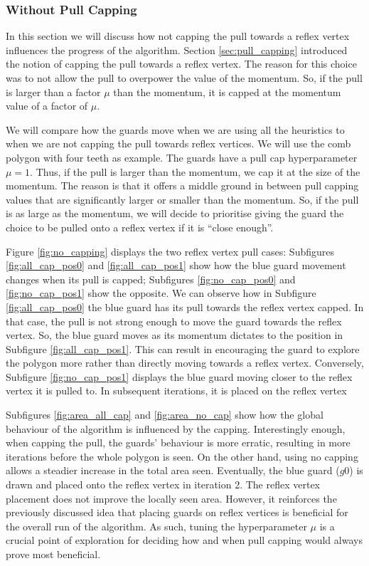 \subsubsection{Without Pull Capping}
In this section we will discuss how not capping the pull towards a reflex vertex influences the progress of the algorithm. Section \ref{sec:pull_capping} introduced the notion of capping the pull towards a reflex vertex. The reason for this choice was to not allow the pull to overpower the value of the momentum. So, if the pull is larger than a factor $\mu$ than the momentum, it is capped at the momentum value of a factor of $\mu$. 

We will compare how the guards move when we are using all the heuristics to when we are not capping the pull towards reflex vertices. We will use the comb polygon with four teeth as example. The guards have a pull cap hyperparameter $\mu = 1$. Thus, if the pull is larger than the momentum, we cap it at the size of the momentum. The reason is that it offers a middle ground in between pull capping values that are significantly larger or smaller than the momentum. So, if the pull is as large as the momentum, we will decide to prioritise giving the guard the choice to be pulled onto a reflex vertex if it is ``close enough''.

Figure \ref{fig:no_capping} displays the two reflex vertex pull cases: Subfigures \ref{fig:all_cap_pos0} and \ref{fig:all_cap_pos1} show how the blue guard movement changes when its pull is capped; Subfigures \ref{fig:no_cap_pos0} and \ref{fig:no_cap_pos1} show the opposite. We can observe how in Subfigure \ref{fig:all_cap_pos0} the blue guard has its pull towards the reflex vertex capped. In that case, the pull is not strong enough to move the guard towards the reflex vertex. So, the blue guard moves as its momentum dictates to the position in Subfigure \ref{fig:all_cap_pos1}. This can result in encouraging the guard to explore the polygon more rather than directly moving towards a reflex vertex.
Conversely, Subfigure \ref{fig:no_cap_pos1} displays the blue guard moving closer to the reflex vertex it is pulled to. In subsequent iterations, it is placed on the reflex vertex

Subfigures \ref{fig:area_all_cap} and \ref{fig:area_no_cap} show how the global behaviour of the algorithm is influenced by the capping. Interestingly enough, when capping the pull, the guards' behaviour is more erratic, resulting in more iterations before the whole polygon is seen. On the other hand, using no capping allows a steadier increase in the total area seen. Eventually, the blue guard ($g0$) is drawn and placed onto the reflex vertex in iteration 2. The reflex vertex placement does not improve the locally seen area. However, it reinforces the previously discussed idea that placing guards on reflex vertices is beneficial for the overall run of the algorithm. As such, tuning the hyperparameter $\mu$ is a crucial point of exploration for deciding how and when pull capping would always prove most beneficial.

